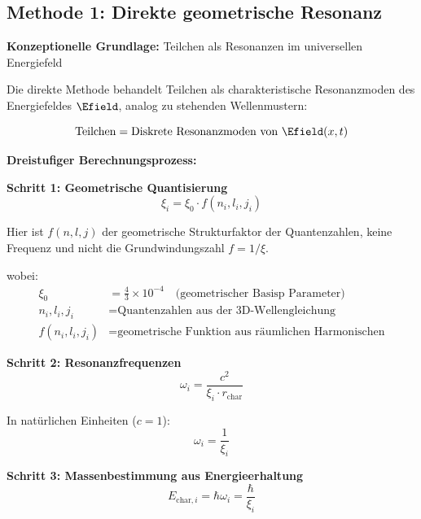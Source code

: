 \subsection{Methode 1: Direkte geometrische Resonanz}
\label{subsec:direct_geometric_method}

\textbf{Konzeptionelle Grundlage:} Teilchen als Resonanzen im universellen Energiefeld

Die direkte Methode behandelt Teilchen als charakteristische Resonanzmoden des Energiefeldes $\Efield$, analog zu stehenden Wellenmustern:

\begin{equation}
	\text{Teilchen} = \text{Diskrete Resonanzmoden von } \Efield(x,t)
\end{equation}

\textbf{Dreistufiger Berechnungsprozess:}

\textbf{Schritt 1: Geometrische Quantisierung}
\begin{equation}
	\xi_i = \xi_0 \cdot f(n_i, l_i, j_i)
	\label{eq:geometric_quantization}
\end{equation}

Hier ist $f(n,l,j)$ der geometrische Strukturfaktor der Quantenzahlen, keine Frequenz und nicht die Grundwindungszahl $f = 1/\xi$.

wobei:
\begin{align}
	\xi_0 &= \frac{4}{3} \times 10^{-4} \quad \text{(geometrischer Basisp Parameter)} \\
	n_i, l_i, j_i &= \text{Quantenzahlen aus der 3D-Wellengleichung} \\
	f(n_i, l_i, j_i) &= \text{geometrische Funktion aus räumlichen Harmonischen}
\end{align}

\textbf{Schritt 2: Resonanzfrequenzen}
\begin{equation}
	\omega_i = \frac{c^2}{\xi_i \cdot r_{\text{char}}}
	\label{eq:resonance_frequencies}
\end{equation}

In natürlichen Einheiten ($c = 1$):
\begin{equation}
	\omega_i = \frac{1}{\xi_i}
\end{equation}

\textbf{Schritt 3: Massenbestimmung aus Energieerhaltung}
\begin{equation}
	E_{\text{char},i} = \hbar \omega_i = \frac{\hbar}{\xi_i}
	\label{eq:energy_from_frequency}
\end{equation}

